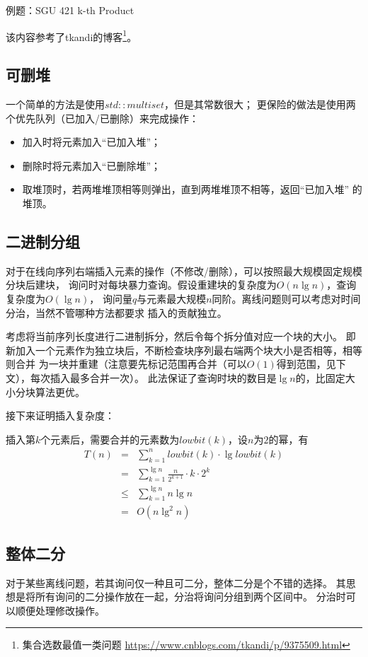 例题：SGU 421 k-th Product

该内容参考了tkandi的博客\footnote{
	集合选数最值一类问题
	\url{https://www.cnblogs.com/tkandi/p/9375509.html}
}。
\subsection{可删堆}\label{MultiSet}
一个简单的方法是使用$std::multiset$，但是其常数很大；
更保险的做法是使用两个优先队列（已加入/已删除）来完成操作：
\begin{itemize}
	\item 加入时将元素加入``已加入堆''；
	\item 删除时将元素加入``已删除堆''；
	\item 取堆顶时，若两堆堆顶相等则弹出，直到两堆堆顶不相等，返回``已加入堆''
	      的堆顶。
\end{itemize}
\subsection{二进制分组}\label{BinIns}
对于在线向序列右端插入元素的操作（不修改/删除），可以按照最大规模固定规模分块后建块，
询问时对每块暴力查询。假设重建块的复杂度为$O(n\lg n)$，查询复杂度为$O(\lg n)$，
询问量$q$与元素最大规模$n$同阶。离线问题则可以考虑对时间分治，当然不管哪种方法都要求
插入的贡献独立。

考虑将当前序列长度进行二进制拆分，然后令每个拆分值对应一个块的大小。
即新加入一个元素作为独立块后，不断检查块序列最右端两个块大小是否相等，相等则合并
为一块并重建（注意要先标记范围再合并（可以$O(1)$得到范围，见下文），每次插入最多合并一次）。
此法保证了查询时块的数目是$\lg n$的，比固定大小分块算法更优。

接下来证明插入复杂度：

插入第$k$个元素后，需要合并的元素数为$lowbit(k)$，设$n$为$2$的幂，有
\begin{eqnarray*}
	T(n)&=&\sum_{k=1}^n {lowbit(k)\cdot \lg lowbit(k)}\\
	&=&\sum_{k=1}^{\lg n} {\frac{n}{2^{k+1}}\cdot k\cdot 2^k}\\
	&\leq&\sum_{k=1}^{\lg n} {n \lg n}\\
	&=&O(n\lg^2 n)
\end{eqnarray*}
\subsection{整体二分}
对于某些离线问题，若其询问仅一种且可二分，整体二分是个不错的选择。
其思想是将所有询问的二分操作放在一起，分治将询问分组到两个区间中。
分治时可以顺便处理修改操作。

